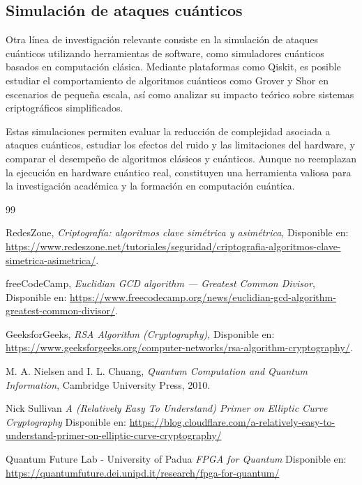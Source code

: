 \documentclass[12pt]{article}
\begin{document}
\subsection{Simulación de ataques cuánticos}

Otra línea de investigación relevante consiste en la simulación de ataques cuánticos utilizando herramientas de software, como simuladores cuánticos basados en computación clásica. Mediante plataformas como Qiskit, es posible estudiar el comportamiento de algoritmos cuánticos como Grover y Shor en escenarios de pequeña escala, así como analizar su impacto teórico sobre sistemas criptográficos simplificados.

Estas simulaciones permiten evaluar la reducción de complejidad asociada a ataques cuánticos, estudiar los efectos del ruido y las limitaciones del hardware, y comparar el desempeño de algoritmos clásicos y cuánticos. Aunque no reemplazan la ejecución en hardware cuántico real, constituyen una herramienta valiosa para la investigación académica y la formación en computación cuántica.



\newpage
\begin{thebibliography}{99}

RedesZone,
\textit{Criptografía: algoritmos clave simétrica y asimétrica},
Disponible en:
\url{https://www.redeszone.net/tutoriales/seguridad/criptografia-algoritmos-clave-simetrica-asimetrica/}.

freeCodeCamp,
\textit{Euclidian GCD algorithm — Greatest Common Divisor},
Disponible en:
\url{https://www.freecodecamp.org/news/euclidian-gcd-algorithm-greatest-common-divisor/}.

GeeksforGeeks,
\textit{RSA Algorithm (Cryptography)},
Disponible en:
\url{https://www.geeksforgeeks.org/computer-networks/rsa-algorithm-cryptography/}.

M. A. Nielsen and I. L. Chuang,
\textit{Quantum Computation and Quantum Information},
Cambridge University Press, 2010.

Nick Sullivan
\textit{A (Relatively Easy To Understand) Primer on Elliptic Curve Cryptography}
Disponible en:
\url{https://blog.cloudflare.com/a-relatively-easy-to-understand-primer-on-elliptic-curve-cryptography/}

Quantum Future Lab - University of Padua
\textit{FPGA for Quantum}
Disponible en:
\url{https://quantumfuture.dei.unipd.it/research/fpga-for-quantum/}
\end{thebibliography}
\end{document}
